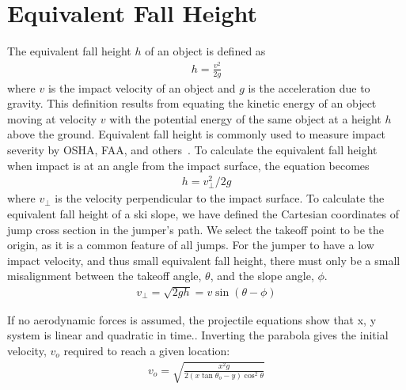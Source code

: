 \documentclass{article}
\begin{document}
\section{Equivalent Fall Height}
%
The equivalent fall height $h$ of an object is defined as
%
\begin{align}
  h = \frac{v^2}{2g}
  \label{eq:efh_general}
\end{align}
%
where $v$ is the impact velocity of an object and $g$ is the acceleration due
to gravity. This definition results from equating the kinetic energy of an
object moving at velocity $v$ with the potential energy of the same object at a
height $h$ above the ground. Equivalent fall height is commonly used to measure
impact severity by OSHA, FAA, and others~\cite{Hubbard2012}. To calculate the
equivalent fall height when impact is at an angle from the impact surface, the
equation becomes
%
\begin{align}
  h = v_{\perp}^2/2g
  \label{eq:efh_slope}
\end{align}
%
where $v_{\perp}$ is the velocity perpendicular to the impact surface. To
calculate the equivalent fall height of a ski slope, we have defined the
Cartesian coordinates of jump cross section in the jumper's path. We select the
takeoff point to be the origin, as it is a common feature of all jumps.
For the jumper to have a low impact velocity, and thus small equivalent fall
height, there must only be a small misalignment between the takeoff
angle, $\theta$, and the slope angle, $\phi$.
%
\begin{align}
  v_{\perp} = \sqrt{2gh} = v\sin(\theta - \phi)
\end{align}

If no aerodynamic forces is assumed, the projectile equations show that x, y
system is linear and quadratic in time..
Inverting the parabola gives the initial velocity, $v_o$ required to reach a
given location:
%
\begin{align}
  v_o = \sqrt{\frac{x^2g}{2(x \tan \theta_o -y)\cos^{2}\theta}}
\end{align}
\end{document}
